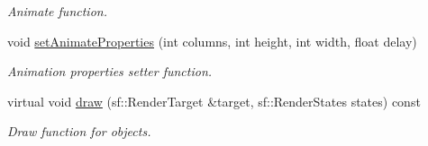 \begin{DoxyCompactItemize}
\begin{DoxyCompactList}\small\item\em Animate function. \end{DoxyCompactList}\item 
\hypertarget{class_movable_ac4e1b69e5c6225f138dba25c4d6dd197}{void \hyperlink{class_movable_ac4e1b69e5c6225f138dba25c4d6dd197}{set\-Animate\-Properties} (int columns, int height, int width, float delay)}\label{class_movable_ac4e1b69e5c6225f138dba25c4d6dd197}

\begin{DoxyCompactList}\small\item\em Animation properties setter function. \end{DoxyCompactList}\item 
virtual void \hyperlink{class_movable_aeae46b44643f7c8d9a58bacba683fe7b}{draw} (sf\-::\-Render\-Target \&target, sf\-::\-Render\-States states) const 
\begin{DoxyCompactList}\small\item\em Draw function for objects. \end{DoxyCompactList}\end{DoxyCompactItemize}
